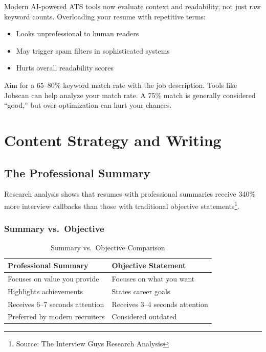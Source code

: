 \documentclass[11pt,a4paper]{article}
\begin{document}
Modern AI-powered ATS tools now evaluate context and readability, not just raw keyword counts. Overloading your resume with repetitive terms:
\begin{itemize}
    \item Looks unprofessional to human readers
    \item May trigger spam filters in sophisticated systems
    \item Hurts overall readability scores
\end{itemize}

\begin{bestpractice}
Aim for a 65--80\% keyword match rate with the job description. Tools like Jobscan can help analyze your match rate. A 75\% match is generally considered ``good,'' but over-optimization can hurt your chances.
\end{bestpractice}

\section{Content Strategy and Writing}

\subsection{The Professional Summary}

Research analysis shows that resumes with professional summaries receive 340\% more interview callbacks than those with traditional objective statements\footnote{Source: The Interview Guys Research Analysis}.

\subsubsection{Summary vs.\ Objective}

\begin{table}[h]
\centering
\begin{tabular}{@{}ll@{}}
\toprule
\textbf{Professional Summary} & \textbf{Objective Statement} \\
\midrule
Focuses on value you provide & Focuses on what you want \\
Highlights achievements & States career goals \\
Receives 6--7 seconds attention & Receives 3--4 seconds attention \\
Preferred by modern recruiters & Considered outdated \\
\bottomrule
\end{tabular}
\caption{Summary vs.\ Objective Comparison}
\end{table}
\end{document}
